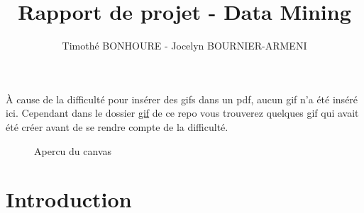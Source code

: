 \documentclass[a4paper]{article}
\date{\vspace{-3ex}}
\begin{document}
\title{Rapport de projet - Data Mining}
\author{Timothé BONHOURE - Jocelyn BOURNIER-ARMENI}
\maketitle
\tableofcontents
\vfill
À cause de la difficulté pour insérer des gifs dans un pdf, aucun gif n'a été inséré ici. Cependant dans le dossier \href{https://github.com/Jocelyn-Bournier/rplace_data_mining/tree/main/gif}{gif} de ce repo vous trouverez quelques gif qui avait été créer avant de se rendre compte de la difficulté.
\vfill
\begin{figure}[h]
    \centering
    \caption{Apercu du canvas}
    \label{fig:animated-gif}
\end{figure}

\newpage

\section{Introduction}
\end{document}
